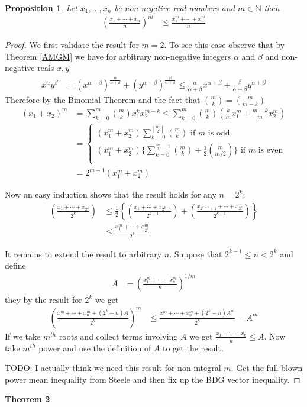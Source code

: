 \documentclass{amsbook}
\newtheorem{thm}{Theorem}[chapter]
\newtheorem{prop}[thm]{Proposition}
\theoremstyle{definition}
\theoremstyle{remark}
\newcommand{\naturals}{\mathbb{N}}
\newcommand{\floor}[1]{\left \lfloor #1 \right \rfloor}
\begin{document}
\begin{prop}\label{SimplePowerMean}Let $x_1, \dotsc, x_n$ be non-negative real numbers and $m
  \in \naturals$ then 
\begin{align*}
\left( \frac{x_1 + \dotsm + x_n}{n} \right)^m &\leq \frac{x^m_1 + \dotsm + x^m_n}{n}
\end{align*}
\end{prop}
\begin{proof}
We first validate the result for $m=2$.  To see this case observe that
by Theorem \ref{AMGM} we have for arbitrary non-negative integers
$\alpha$ and $\beta$ and non-negative reals $x,y$
\begin{align*}
x^\alpha y^\beta &= 
(x^{\alpha+\beta})^{\frac{\alpha}{\alpha + \beta}}
+ (y^{\alpha+\beta})^{\frac{\beta}{\alpha + \beta}}
\leq \frac{\alpha}{\alpha + \beta} x^{\alpha+\beta} + 
\frac{\beta}{\alpha + \beta} y^{\alpha+\beta}
\end{align*}
Therefore by the Binomial Theorem and the fact that $\binom{m}{k} = \binom{m}{m-k}$
\begin{align*}
(x_1 + x_2)^m &= \sum_{k=0}^m \binom{m}{k} x_1^k x_2^{m-k}
\leq \sum_{k=0}^m \binom{m}{k} \left(\frac{k}{m} x_1^m + \frac{m-k}{m} x_2^m \right) \\
&= \begin{cases}
\left(x_1^m + x_2^m \right) \sum_{k=0}^{\floor{\frac{m}{2}}} \binom{m}{k} \text{ if $m$ is odd}\\
\left(x_1^m + x_2^m \right) \lbrace\sum_{k=0}^{\frac{m}{2} -1} \binom{m}{k} + \frac{1}{2}\binom{m}{m/2} \rbrace \text{ if $m$ is even}\\
\end{cases} \\
&= 2^{m-1} \left(x_1^m + x_2^m \right)
\end{align*}

Now an easy induction shows that the result holds for any $n=2^k$:
\begin{align*}
\left( \frac{x_1 + \dotsm + x_{2^k}}{2^k} \right)
&\leq
\frac{1}{2} \left \lbrace \left(\frac{x_1 + \dotsm + x_{2^{k-1}}}{2^{k-1}} \right) +
\left(\frac{x_{2^{k-1} + 1} + \dotsm + x_{2^{k}}}{2^{k-1}} \right) \right \rbrace \\
&\leq \frac{x_1^m + \dotsm + x_{2^k}^m}{2^k}
\end{align*}

It remains to extend the result to arbitrary $n$.  Suppose that $2^{k-1} \leq n < 2^k$ and 
define 
\begin{align*}
A &= \left ( \frac{x_1^m + \dotsm + x_n^m}{n} \right)^{1/m}
\end{align*}
they by the result for $2^k$ we get
\begin{align*}
\left( \frac{x_1^m + \dotsm + x_n^m + (2^k - n)A}{2^k} \right)^m 
&\leq
\frac{x_1^m + \dotsm + x_n^m +  (2^k - n)A^m}{2^k} = A^m
\end{align*}
If we take $m^{th}$ roots and collect terms involving $A$ we get $\frac{x_1 + \dotsm + x_k}{k} \leq A$.
Now take $m^{th}$ power and use the definition of $A$ to get the
result.

TODO: I actually think we need this result for non-integral $m$.  Get
the full blown power mean inequality from Steele and then fix up the
BDG vector inequality.
\end{proof}

\begin{thm}\label{StirlingsFormula}
\end{thm}
\end{document}
